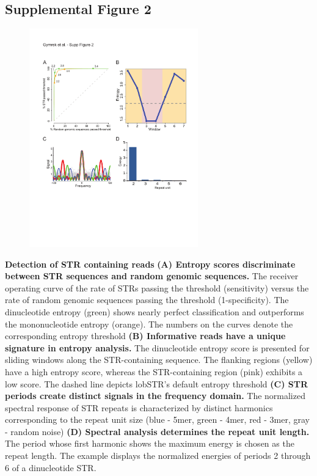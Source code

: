 {\subsection{Supplemental Figure 2}
\begin{figure}[h!]
\centering
\label{fig:lobsup2}
\includegraphics[width=0.65\textwidth]{Figures/Chapter2/SuppFig2.pdf}
\end{figure}
\textbf{Detection of STR containing reads} \textbf{(A) Entropy scores discriminate between STR sequences and random genomic sequences.} The receiver operating curve of the rate of STRs passing the threshold (sensitivity) versus the rate of random genomic sequences passing the threshold (1-specificity). The dinucleotide entropy (green) shows nearly perfect classification and outperforms the mononucleotide entropy (orange). The numbers on the curves denote the corresponding entropy threshold \textbf{(B) Informative reads have a unique signature in entropy analysis.} The dinucleotide entropy score is presented for sliding windows along the STR-containing sequence. The flanking regions (yellow) have a high entropy score, whereas the STR-containing region (pink) exhibits a low score. The dashed line depicts lobSTR's default entropy threshold \textbf{(C) STR periods create distinct signals in the frequency domain.} The normalized spectral response of STR repeats is characterized by distinct harmonics corresponding to the repeat unit size (blue - 5mer, green - 4mer, red - 3mer, gray - random noise) \textbf{(D) Spectral analysis determines the repeat unit length.} The period whose first harmonic shows the maximum energy is chosen as the repeat length. The example displays the normalized energies of periods 2 through 6 of a dinucleotide STR. 

}
